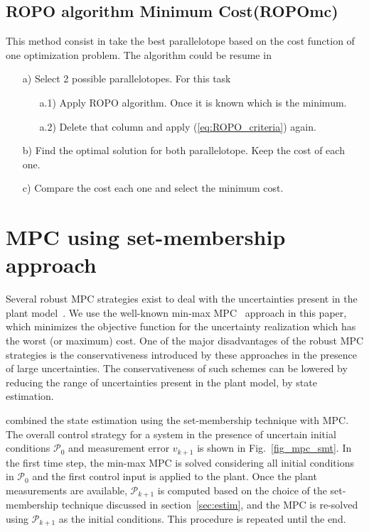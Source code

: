 \documentclass{ifacconf}
\newcommand{\eg}{\text{e.g., }}
\begin{document}
\subsection{ROPO algorithm Minimum Cost(ROPOmc)}
This method consist in take the best parallelotope based on the cost function of one optimization problem. The algorithm could be resume in
\begin{enumerate}
\item [a)]Select 2 possible parallelotopes. For this task
\begin{enumerate}
\item [a.1)]Apply ROPO algorithm. Once it is known which is the minimum.
\item [a.2)]Delete that column and apply (\ref{eq:ROPO_criteria}) again.  
\end{enumerate}
\item [b)] Find the optimal solution for both parallelotope. Keep the cost of each one.
\item [c)] Compare the cost each one and select the minimum cost.
\end{enumerate} 
\label{subsec:ROPOm}
\section{MPC using set-membership approach}
\label{sec:MPC}
Several robust MPC strategies exist to deal with the uncertainties present in the plant model~\citep{Mayne2014}. We use the well-known min-max MPC~\citep{Bemporad1999} approach in this paper, which minimizes the objective function for the uncertainty realization which has the worst (or maximum) cost. One of the major disadvantages of the robust MPC strategies is the conservativeness introduced by these approaches in the presence of large uncertainties. The conservativeness of such schemes can be lowered by reducing the range of uncertainties present in the plant model, \eg by state estimation.

\citep{Garulli1997} combined the state estimation using the set-membership technique with MPC. The overall control strategy for a system in the presence of uncertain initial conditions $\mathcal{P}_{0}$ and measurement error $v_{k+1}$ is shown in Fig.~\ref{fig_mpc_smt}. In the first time step, the min-max MPC is solved considering all initial conditions in $\mathcal{P}_{0}$ and the first control input is applied to the plant. Once the plant measurements are available, $\mathcal{P}_{k+1}$ is computed based on the choice of the set-membership technique discussed in section~\ref{sec:estim}, and the MPC is re-solved using $\mathcal{P}_{k+1}$ as the initial conditions. This procedure is repeated until the end.
\end{document}
